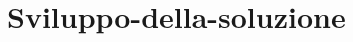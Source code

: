 \documentclass[a4paper,12pt]{report}  %
\begin{document}

\chapter{Sviluppo-della-soluzione} 
	
	
	
\newpage %



\newpage %



\newpage %




\end{document}
